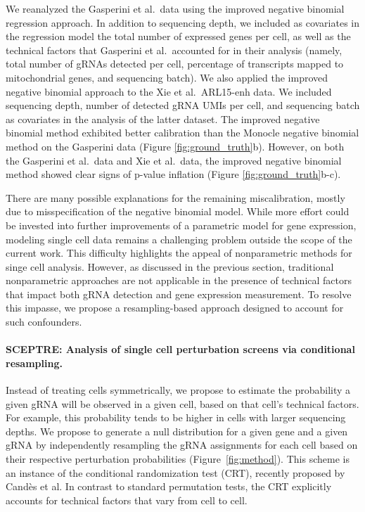 \documentclass{nature}
\begin{document}
We reanalyzed the Gasperini et al.\ data using the improved negative binomial regression approach. In addition to sequencing depth, we included as covariates in the regression model the total number of expressed genes per cell, as well as the technical factors that Gasperini et al.\ accounted for in their analysis (namely, total number of gRNAs detected per cell, percentage of transcripts mapped to mitochondrial genes, and sequencing batch). We also applied the improved negative binomial approach to the Xie et al.\ ARL15-enh data. We included sequencing depth, number of detected gRNA UMIs per cell, and sequencing batch as covariates in the analysis of the latter dataset. The improved negative binomial method exhibited better calibration than the Monocle negative binomial method on the Gasperini data (Figure \ref{fig:ground_truth}b). However, on both the Gasperini et al.\ data and Xie et al.\ data, the improved negative binomial method showed clear signs of p-value inflation (Figure \ref{fig:ground_truth}b-c).

There are many possible explanations for the remaining miscalibration, mostly due to misspecification of the negative binomial model. While more effort could be invested into further improvements of a parametric model for gene expression, modeling single cell data remains a challenging problem outside the scope of the current work. This difficulty highlights the appeal of nonparametric methods for singe cell analysis.\cite{Zhu2019} However, as discussed in the previous section, traditional nonparametric approaches are not applicable in the presence of technical factors that impact both gRNA detection and gene expression measurement. To resolve this impasse, we propose a resampling-based approach designed to account for such confounders.

\paragraph{SCEPTRE: Analysis of single cell perturbation screens via conditional resampling.} 

Instead of treating cells symmetrically, we propose to estimate the probability a given gRNA will be observed in a given cell, based on that cell's technical factors. For example, this probability tends to be higher in cells with larger sequencing depths. We propose to generate a null distribution for a given gene and a given gRNA by independently resampling the gRNA assignments for each cell based on their respective perturbation probabilities (Figure~\ref{fig:method}). This scheme is an instance of the conditional randomization test (CRT), recently proposed by Cand\`{e}s et al.\cite{CetL16} In contrast to standard permutation tests, the CRT explicitly accounts for technical factors that vary from cell to cell.
\end{document}
